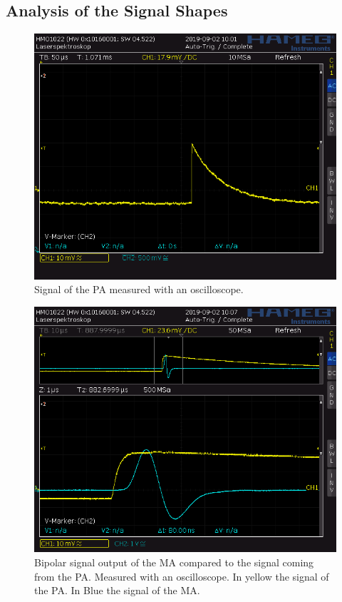 \documentclass[30pt,a4paper]{article}
\begin{document}
 	\subsection{Analysis of the Signal Shapes}
 	\begin{figure}
 		\includegraphics[scale=0.42]{Bilder/OsziPA}
 		\centering
 		\caption[PA]{Signal of the PA measured with an oscilloscope.}
 		\label{PA}
 	\end{figure}
 	\begin{figure}
 		\includegraphics[scale=0.42]{Bilder/OsziBipolar}
 		\centering
 		\caption[Bipolar]{Bipolar signal output of the MA compared to the signal coming from the PA. Measured with an oscilloscope. In yellow the signal of the PA. In Blue the signal of the MA.}
 		\label{Bi}
 	\end{figure}
\end{document}
